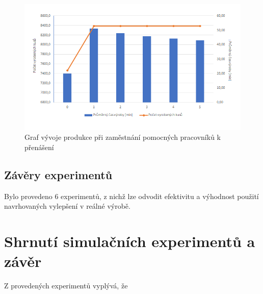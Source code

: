 \documentclass[11pt, a4paper]{article}
\begin{document}
\begin{figure}[H]
    \centering
    \includegraphics[width=17cm]{gr2}
    \caption{Graf vývoje produkce při zaměstnání pomocných pracovníků k přenášení}
    \label{gr2}
\end{figure}


\subsection{Závěry experimentů}
Bylo provedeno 6 experimentů, z nichž lze odvodit efektivitu a výhodnost použití navrhovaných vylepšení v reálné výrobě.

\section{Shrnutí simulačních experimentů a závěr}
Z provedených experimentů vyplývá, že

\newpage


\end{document}
